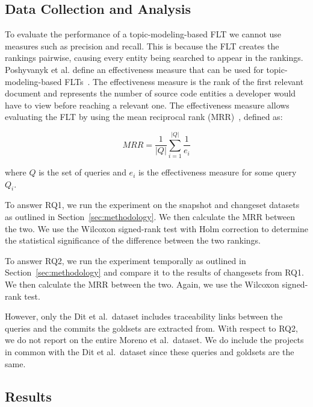 

\subsection{Data Collection and Analysis}
\label{sec:data}

To evaluate the performance of a topic-modeling-based FLT we cannot use
measures such as precision and recall. This is because the FLT creates
the rankings pairwise, causing every entity being searched to appear in the rankings.
Poshyvanyk et al. define an effectiveness measure that can be used for topic-modeling-based FLTs~\cite{Poshyvanyk-etal:2007}.
The effectiveness measure is the rank of the first relevant document
and represents the number of source code entities a developer would have to view before reaching a relevant one.
The effectiveness measure allows evaluating the FLT by using
the mean reciprocal rank (MRR)~\cite{Voorhees:1999}, defined as:

\begin{equation}
    MRR = \frac{1}{|Q|} \sum_{i=1}^{|Q|} \frac{1}{e_i}
\end{equation}

where $Q$ is the set of queries
and $e_i$ is the effectiveness measure for some query $Q_i$.

To answer RQ1, we run the experiment on the snapshot and changeset
datasets as outlined in Section~\ref{sec:methodology}.
We then calculate the MRR between the two.
We use the Wilcoxon signed-rank test with Holm correction to determine
the statistical significance of the difference between the two rankings.

To answer RQ2, we run the experiment temporally as outlined in Section~\ref{sec:methodology}
and compare it to the results of changesets from RQ1.
We then calculate the MRR between the two.
Again, we use the Wilcoxon signed-rank test.

However, only the Dit et al.\ dataset includes traceability links between
the queries and the commits the goldsets are extracted from.
With respect to RQ2, we do not report on the entire Moreno et al.\ dataset.
We do include the projects in common with the Dit et al.\ dataset
since these queries and goldsets are the same.



\subsection{Results}


